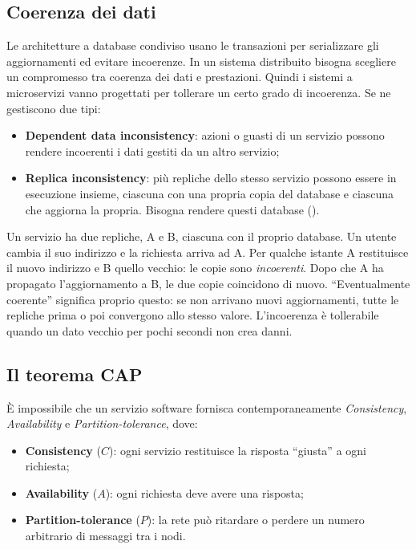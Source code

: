 \subsection{Coerenza dei dati}

Le architetture a database condiviso usano le transazioni  per serializzare gli aggiornamenti ed evitare
incoerenze. In un sistema distribuito bisogna scegliere un compromesso tra coerenza dei dati e prestazioni. Quindi i
sistemi a microservizi vanno progettati per tollerare un certo grado di incoerenza. Se ne gestiscono due tipi:
\begin{itemize}
  \item \textbf{Dependent data inconsistency}: azioni o guasti di un servizio possono rendere incoerenti i dati gestiti da
    un altro servizio;
  \item \textbf{Replica inconsistency}: più repliche dello stesso servizio possono essere in esecuzione insieme, ciascuna con
    una propria copia del database e ciascuna che aggiorna la propria. Bisogna rendere questi database
     ().
\end{itemize}

\begin{esempio}
Un servizio ha due repliche, A e B, ciascuna con il proprio database. Un utente cambia il suo indirizzo e la
richiesta arriva ad A. Per qualche istante A restituisce il nuovo indirizzo e B quello vecchio: le copie sono
\emph{incoerenti}. Dopo che A ha propagato l'aggiornamento a B, le due copie coincidono di nuovo. ``Eventualmente
coerente'' significa proprio questo: se non arrivano nuovi aggiornamenti, tutte le repliche prima o poi
convergono allo stesso valore. L'incoerenza è tollerabile quando un dato vecchio per pochi secondi non crea danni.
\end{esempio}

\subsection{Il teorema CAP}

\begin{teorema}
È impossibile che un servizio software fornisca contemporaneamente \emph{Consistency}, \emph{Availability} e
\emph{Partition-tolerance}, dove:
\begin{itemize}
  \item \textbf{Consistency} ($C$): ogni servizio restituisce la risposta ``giusta'' a ogni richiesta;
  \item \textbf{Availability} ($A$): ogni richiesta deve avere una risposta;
  \item \textbf{Partition-tolerance} ($P$): la rete può ritardare o perdere un numero arbitrario di messaggi tra i nodi.
\end{itemize}
\end{teorema}

